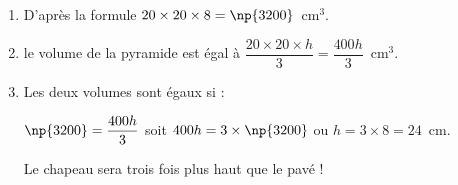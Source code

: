 \begin{enumerate}
\item %
D'après la formule $20 \times 20 \times 8 = \np{3200}$~cm$^3$. 
\item %
le volume de la pyramide est égal à $\dfrac{20 \times 20 \times h}{3} = \dfrac{400h}{3}$~cm$^3$. 
\item %
Les deux volumes sont égaux si :

$\np{3200} =  \dfrac{400h}{3}$ soit $400h = 3 \times \np{3200}$ ou $h = 3 \times 8 = 24$~cm.

Le chapeau sera trois fois plus haut que le pavé !
\end{enumerate} 

\bigskip 

